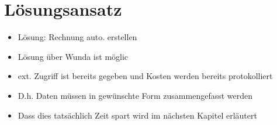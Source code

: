 \section{Lösungsansatz}
\begin{itemize}
	\item Lösung: Rechnung auto. erstellen
	\item Lösung über Wunda ist möglic
	\item ext. Zugriff ist bereits gegeben und Kosten werden bereits protokolliert
	\item D.h. Daten müssen in gewünschte Form zusammengefasst werden
	\item Dass dies tatsächlich Zeit spart wird im nächsten Kapitel erläutert
\end{itemize}